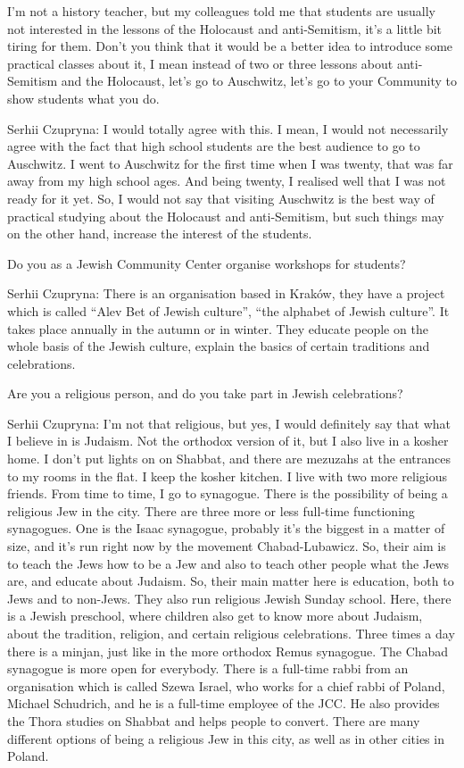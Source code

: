 I’m not a history teacher, but my colleagues told me that students are usually not interested in the lessons of the Holocaust and anti-Semitism, it’s a little bit tiring for them. Don’t you think that it would be a better idea to introduce some practical classes about it, I mean instead of two or three lessons about anti-Semitism and the Holocaust, let’s go to Auschwitz, let’s go to your Community to show students what you do.  

Serhii Czupryna: I would totally agree with this. I mean, I would not necessarily agree with the fact that high school students are the best audience to go to Auschwitz. I went to Auschwitz for the first time when I was twenty, that was far away from my high school ages. And being twenty, I realised well that I was not ready for it yet. So, I would not say that visiting Auschwitz is the best way of practical studying about the Holocaust and anti-Semitism, but such things may on the other hand, increase the interest of the students.  

 Do you as a Jewish Community Center organise workshops for students?   

Serhii Czupryna: There is an organisation based in Kraków, they have a project which is called “Alev Bet of Jewish culture”, “the alphabet of Jewish culture”. It takes place annually in the autumn or in winter. They educate people on the whole basis of the Jewish culture, explain the basics of certain traditions and celebrations. 

Are you a religious person, and do you take part in Jewish celebrations? 

Serhii Czupryna: I’m not that religious, but yes, I would definitely say that what I believe in is Judaism. Not the orthodox version of it, but I also live in a kosher home. I don’t put lights on on Shabbat, and there are mezuzahs at the entrances to my rooms in the flat. I keep the kosher kitchen. I live with two more religious friends. From time to time, I go to synagogue.  
There is the possibility of being a religious Jew in the city. There are three more or less full-time functioning synagogues. One is the Isaac synagogue, probably it’s the biggest in a matter of size, and it’s run right now by the movement Chabad-Lubawicz. So, their aim is to teach the Jews how to be a Jew and also to teach other people what the Jews are, and educate about Judaism. So, their main matter here is education, both to Jews and to non-Jews. They also run religious Jewish Sunday school. Here, there is a Jewish preschool, where children also get to know more about Judaism, about the tradition, religion, and certain religious celebrations. Three times a day there is a minjan, just like in the more orthodox Remus synagogue. The Chabad synagogue is more open for everybody. There is a full-time rabbi from an organisation which is called Szewa Israel, who works for a chief rabbi of Poland, Michael Schudrich, and he is a full-time employee of the JCC. He also provides the Thora studies on Shabbat and helps people to convert. There are many different options of being a religious Jew in this city, as well as in other cities in Poland.  

